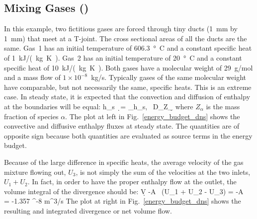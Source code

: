 \documentclass[11pt]{book}
\begin{document}
\clearpage


\subsection{Mixing Gases (\texorpdfstring{}{energy\_budget\_dns})}

In this example, two fictitious gases are forced through tiny ducts (1~mm by 1~mm) that meet at a T-joint. The cross sectional areas of all the ducts are the same. Gas~1 has an initial temperature of 606.3~\si{\degree C} and a constant specific heat of 1~\si{kJ/(kg.K)}. Gas~2 has an initial temperature of 20~\si{\degree C} and a constant specific heat of 10~\si{kJ/(kg.K)}. Both gases have a molecular weight of 29~g/mol and a mass flow of $1 \times 10^{-8}$~kg/s. Typically gases of the same molecular weight have comparable, but not necessarily the same, specific heats. This is an extreme case. In steady state, it is expected that the convection and diffusion of enthalpy at the boundaries will be equal:
\be \int h_{\rm s} \, \rho \bu \cdot \d\bS = \sum_\alpha \int h_{s,\alpha} \, \rho D_\alpha \nabla Z_\alpha \cdot \d\bS \ee
where $Z_\alpha$ is the mass fraction of species $\alpha$.  The plot at left in Fig.~\ref{energy_budget_dns} shows the convective and diffusive enthalpy fluxes at steady state. The quantities are of opposite sign because both quantities are evaluated as source terms in the energy budget.

Because of the large difference in specific heats, the average velocity of the gas mixture flowing out, $U_3$, is not simply the sum of the velocities at the two inlets, $U_1+U_2$. In fact, in order to have the proper enthalpy flow at the outlet, the volume integral of the divergence should be:
\be \int \nabla \cdot \bu \; \d V \equiv -A \, (U_1 + U_2 - U_3) = -A \,  = -1.357 ^{-8} \; \hbox{m}^3/\hbox{s} \label{div2} \ee
The plot at right in Fig.~\ref{energy_budget_dns} shows the resulting and integrated divergence or net volume flow.
\end{document}
